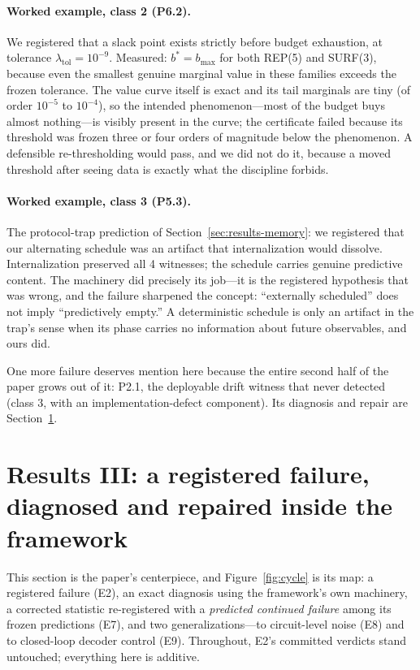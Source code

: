 \documentclass[11pt]{article}
\theoremstyle{definition}
\begin{document}
\paragraph{Worked example, class 2 (P6.2).} We registered that a slack point exists strictly before budget exhaustion, at tolerance $\lambda_{\mathrm{tol}} = 10^{-9}$. Measured: $b^{*} = b_{\max}$ for both REP(5) and SURF(3), because even the smallest genuine marginal value in these families exceeds the frozen tolerance. The value curve itself is exact and its tail marginals are tiny (of order $10^{-5}$ to $10^{-4}$), so the intended phenomenon---most of the budget buys almost nothing---is visibly present in the curve; the certificate failed because its threshold was frozen three or four orders of magnitude below the phenomenon. A defensible re-thresholding would pass, and we did not do it, because a moved threshold after seeing data is exactly what the discipline forbids.

\paragraph{Worked example, class 3 (P5.3).} The protocol-trap prediction of Section~\ref{sec:results-memory}: we registered that our alternating schedule was an artifact that internalization would dissolve. Internalization preserved all 4 witnesses; the schedule carries genuine predictive content. The machinery did precisely its job---it is the registered hypothesis that was wrong, and the failure sharpened the concept: ``externally scheduled'' does not imply ``predictively empty.'' A deterministic schedule is only an artifact in the trap's sense when its phase carries no information about future observables, and ours did.

One more failure deserves mention here because the entire second half of the paper grows out of it: P2.1, the deployable drift witness that never detected (class 3, with an implementation-defect component). Its diagnosis and repair are Section~\ref{sec:arc}.

 \section{Results III: a registered failure, diagnosed and repaired inside the framework}
\label{sec:arc}

This section is the paper's centerpiece, and Figure~\ref{fig:cycle} is its map: a registered failure (E2), an exact diagnosis using the framework's own machinery, a corrected statistic re-registered with a \emph{predicted continued failure} among its frozen predictions (E7), and two generalizations---to circuit-level noise (E8) and to closed-loop decoder control (E9). Throughout, E2's committed verdicts stand untouched; everything here is additive.
\end{document}
